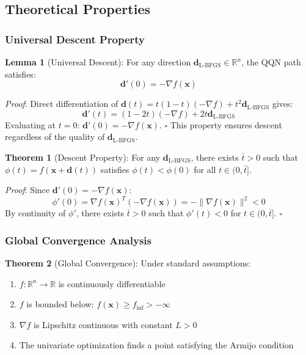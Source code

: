 \hypertarget{theoretical-properties}{%
\subsection{Theoretical Properties}\label{theoretical-properties}}

\hypertarget{universal-descent-property}{%
\subsubsection{Universal Descent Property}\label{universal-descent-property}}

\textbf{Lemma 1} (Universal Descent): For any direction \(\mathbf{d}_{\text{L-BFGS}} \in \mathbb{R}^n\), the QQN path satisfies:
\[\mathbf{d}'(0) = -\nabla f(\mathbf{x})\]

\emph{Proof}: Direct differentiation of \(\mathbf{d}(t) = t(1-t)(-\nabla f) + t^2 \mathbf{d}_{\text{L-BFGS}}\) gives:
\[\mathbf{d}'(t) = (1-2t)(-\nabla f) + 2t\mathbf{d}_{\text{L-BFGS}}\]
Evaluating at \(t=0\): \(\mathbf{d}'(0) = -\nabla f(\mathbf{x})\). \(\square\)
This property ensures descent regardless of the quality of \(\mathbf{d}_{\text{L-BFGS}}\).

\textbf{Theorem 1} (Descent Property): For any \(\mathbf{d}_{\text{L-BFGS}}\), there exists \(\bar{t} > 0\) such that \(\phi(t) = f(\mathbf{x} + \mathbf{d}(t))\) satisfies \(\phi(t) < \phi(0)\) for all \(t \in (0, \bar{t}]\).

\emph{Proof}: Since \(\mathbf{d}'(0) = -\nabla f(\mathbf{x})\):
\[\phi'(0) = \nabla f(\mathbf{x})^T(-\nabla f(\mathbf{x})) = -\|\nabla f(\mathbf{x})\|^2 < 0\]
By continuity of \(\phi'\), there exists \(\bar{t} > 0\) such that \(\phi'(t) < 0\) for \(t \in (0, \bar{t}]\). \(\square\)

\hypertarget{global-convergence-analysis}{%
\subsubsection{Global Convergence Analysis}\label{global-convergence-analysis}}

\textbf{Theorem 2} (Global Convergence): Under standard assumptions:

\begin{enumerate}
\def\labelenumi{\arabic{enumi}.}
\tightlist
\item
  \(f: \mathbb{R}^n \rightarrow \mathbb{R}\) is continuously differentiable
\item
  \(f\) is bounded below: \(f(\mathbf{x}) \geq f_{\text{inf}} > -\infty\)
\item
  \(\nabla f\) is Lipschitz continuous with constant \(L > 0\)
\item
  The univariate optimization finds a point satisfying the Armijo condition
\end{enumerate}

